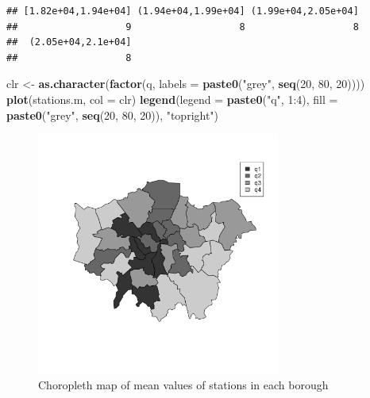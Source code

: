 \documentclass[]{article}
\newenvironment{Shaded}{}{}
\newcommand{\KeywordTok}[1]{\textcolor[rgb]{0.00,0.44,0.13}{\textbf{{#1}}}}
\newcommand{\DataTypeTok}[1]{\textcolor[rgb]{0.56,0.13,0.00}{{#1}}}
\newcommand{\DecValTok}[1]{\textcolor[rgb]{0.25,0.63,0.44}{{#1}}}
\newcommand{\StringTok}[1]{\textcolor[rgb]{0.25,0.44,0.63}{{#1}}}
\newcommand{\NormalTok}[1]{{#1}}
\let\Oldincludegraphics\includegraphics
\renewcommand{\includegraphics}[1]{\Oldincludegraphics[width=8cm]{#1}}
\begin{document}
\begin{Shaded}
\end{Shaded}
\begin{verbatim}
## [1.82e+04,1.94e+04] (1.94e+04,1.99e+04] (1.99e+04,2.05e+04] 
##                   9                   8                   8 
##  (2.05e+04,2.1e+04] 
##                   8
\end{verbatim}
\begin{Shaded}
\begin{Highlighting}[]
\NormalTok{clr <- }\KeywordTok{as.character}\NormalTok{(}\KeywordTok{factor}\NormalTok{(q, }\DataTypeTok{labels =} \KeywordTok{paste0}\NormalTok{(}\StringTok{"grey"}\NormalTok{, }\KeywordTok{seq}\NormalTok{(}\DecValTok{20}\NormalTok{, }\DecValTok{80}\NormalTok{, }\DecValTok{20}\NormalTok{))))}
\KeywordTok{plot}\NormalTok{(stations.m, }\DataTypeTok{col =} \NormalTok{clr)}
\KeywordTok{legend}\NormalTok{(}\DataTypeTok{legend =} \KeywordTok{paste0}\NormalTok{(}\StringTok{"q"}\NormalTok{, }\DecValTok{1}\NormalTok{:}\DecValTok{4}\NormalTok{), }\DataTypeTok{fill =} \KeywordTok{paste0}\NormalTok{(}\StringTok{"grey"}\NormalTok{, }\KeywordTok{seq}\NormalTok{(}\DecValTok{20}\NormalTok{, }\DecValTok{80}\NormalTok{, }\DecValTok{20}\NormalTok{)), }\StringTok{"topright"}\NormalTok{)}
\end{Highlighting}
\end{Shaded}
\begin{figure}[htbp]
\centering
\includegraphics{figure/Choropleth_map_of_mean_values_of_stations_in_each_borough.png}
\caption{Choropleth map of mean values of stations in each
borough}
\end{figure}
\end{document}
